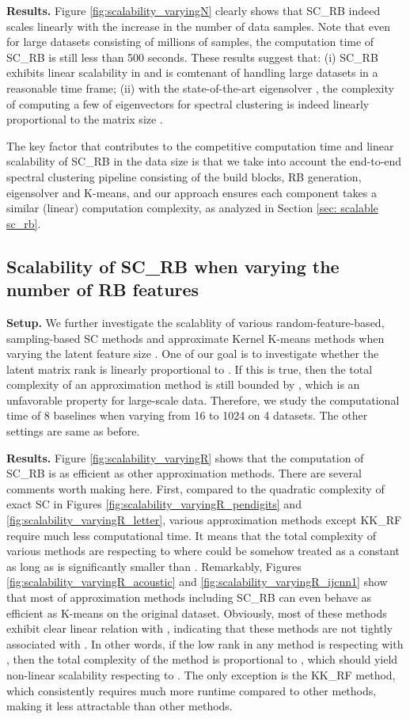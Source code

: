 \documentclass[sigconf]{acmart}
\newcommand{\1}{\boldsymbol{1}}
\newcommand{\0}{\boldsymbol{0}}
\begin{document}
\textbf{Results.} Figure \ref{fig:scalability_varyingN} clearly shows that SC\_RB indeed scales linearly with the increase in the number of data samples.
Note that even for large datasets consisting of millions of samples, the computation time of SC\_RB is still less than 500 seconds. These results suggest that: (i) SC\_RB exhibits linear scalability in  and is comtenant of handling large datasets in a reasonable time frame; (ii) with the state-of-the-art eigensolver \cite{wu2017primme_svds}, the complexity of computing a few of eigenvectors for spectral clustering is indeed linearly proportional to the matrix size . 

The key factor that contributes to the competitive computation time and linear scalability of  SC\_RB in the data size  is that we take into account the end-to-end spectral clustering pipeline consisting of the build blocks, RB generation, eigensolver and K-means, and our approach ensures each component takes a similar (linear) computation complexity, as analyzed in Section \ref{sec: scalable sc_rb}.


\subsection{Scalability of SC\_RB when varying the number of RB features }

\textbf{Setup.} We further investigate the scalablity of various random-feature-based, sampling-based SC methods and approximate Kernel K-means methods when varying the latent feature size . One of our goal is to investigate whether the latent matrix rank  is linearly proportional to . If this is true, then the total complexity of an approximation method is still bounded by , which is an unfavorable property for large-scale data. Therefore, we study the computational time of 8 baselines when varying  from 16 to 1024 on 4 datasets. The other settings are same as before. 

\textbf{Results.} Figure \ref{fig:scalability_varyingR} shows that the computation of SC\_RB is as efficient as other approximation methods. There are several comments worth making here. First, compared to the quadratic complexity of exact SC in Figures \ref{fig:scalability_varyingR_pendigits} and \ref{fig:scalability_varyingR_letter}, various approximation methods except KK\_RF require much less computational time. It means that the total complexity of various methods are respecting to  where  could be somehow treated as a constant as long as  is significantly smaller than . Remarkably, Figures \ref{fig:scalability_varyingR_acoustic} and \ref{fig:scalability_varyingR_ijcnn1} show that most of approximation methods including SC\_RB can even behave as efficient as K-means on the original dataset. Obviously, most of these methods exhibit clear linear relation with , indicating that these methods are not tightly associated with . In other words, if the low rank  in any method is respecting with , then the total complexity of the method is proportional to , which should yield non-linear scalability respecting to . The only exception is the KK\_RF method, which consistently requires much more runtime compared to other methods, making it less attractable than other methods.   
\end{document}
